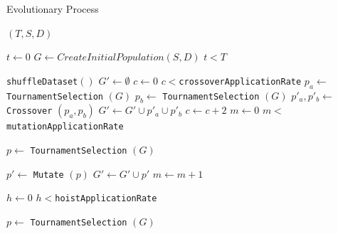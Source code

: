 \documentclass[a4paper,12pt]{article}
\begin{document}
            \begin{minipage}{.5\textwidth}
                \begin{algorithm}[H]
                    \tiny
                    \caption{Evolutionary Process} 
                    \label{alg:evolution}
                    \Evolution
                    {
                        $(T,S,D)$
                    }
                    {
                        $t \gets 0$ \;
                        $G \gets CreateInitialPopulation(S,D)$ \;
                        \While
                        {
                            $t < T$
                        }
                        {
                            \texttt{shuffleDataset}$()$ \;
                            $ G' \gets \emptyset$\;
                            $ c \gets 0$\;
                            \For
                            {
                                $c < $\texttt{crossoverApplicationRate}
                            }
                            {
                                $p_a \gets $ \texttt{TournamentSelection} $(G)$ \;
                                $p_b \gets $ \texttt{TournamentSelection} $(G)$ \;
                                $p'_a , p'_b \gets $ \texttt{Crossover} $(p_a , p_b)$ \;
                                $ G' \gets G' \cup p'_a \cup p'_b$\;
                                $ c \gets c + 2$ \;
                            }
                            $ m \gets 0$\;
                            \For
                            {
                                $m < $\texttt{mutationApplicationRate}
                            }
                            {
                                $p \gets $ \texttt{TournamentSelection} $(G)$ \;
                                
                                $p' \gets $ \texttt{Mutate} $(p)$ \;
                                $ G' \gets G' \cup p'$\;
                                $ m \gets m + 1$ \;
                            }
                            $ h \gets 0$\;
                            \For
                            {
                                $h < $\texttt{hoistApplicationRate}
                            }
                            {
                                $p \gets $ \texttt{TournamentSelection} $(G)$ \;
                                
}}}
\end{algorithm}
\end{minipage}
\end{document}
